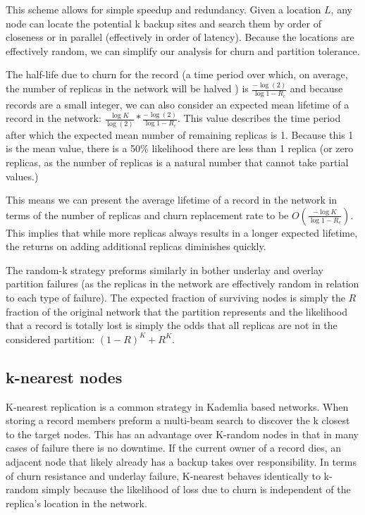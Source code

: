 This scheme allows for simple speedup and redundancy.
Given a location $L$, any node can locate the potential k backup sites and search them by order of closeness or in parallel (effectively in order of latency).
Because the locations are effectively random, we can simplify our analysis for churn and partition tolerance.

The half-life due to churn for the record (a time period over which, on average, the number of replicas in the network will be halved ) is $\frac{-\log(2)}{\log{1-R_{c}}}$ and because records are a small integer, we can also consider an expected mean lifetime of a record in the network: $\frac{\log{K}}{\log(2)} * \frac{-\log(2)}{\log{1-R_{c}}}$. This value describes the time period after which the expected mean number of remaining replicas is 1. Because this 1 is the mean value, there is a 50\% likelihood there are less than 1 replica (or zero replicas, as the number of replicas is a natural number that cannot take partial values.)

This means we can present the average lifetime of a record in the network in terms of the number of replicas and churn replacement rate to be $O(\frac{-\log{K}}{\log{1-R_{c}}})$.
This implies that while more replicas always results in a longer expected lifetime, the returns on adding additional replicas diminishes quickly.

The random-k strategy preforms similarly in bother underlay and overlay partition failures (as the replicas in the network are effectively random in relation to each type of failure).
The expected fraction of surviving nodes is simply the $R$ fraction of the original network that the partition represents and the likelihood that a record is totally lost is simply the odds that all replicas are not in the considered partition: $(1-R)^{K}+R^{K}$. 


\subsection{k-nearest nodes}
K-nearest replication is a common strategy in Kademlia based networks.
When storing a record members preform a multi-beam search to discover the k closest to the target nodes.
This has an advantage over K-random nodes in that in many cases of failure there is no downtime.
If the current owner of a record dies, an adjacent node that likely already has a backup takes over responsibility.
In terms of churn resistance and underlay failure, K-nearest behaves identically to k-random simply because the likelihood of loss due to churn is independent of the replica's location in the network.

